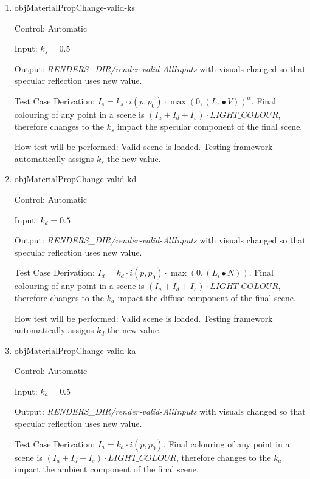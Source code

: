 \documentclass[12pt, titlepage]{article}
\begin{document}
\begin{enumerate}
	\item{objMaterialPropChange-valid-ks\\}
	
	Control: Automatic
	
	Input: $k_{s} = 0.5$
	
	Output: \textit{RENDERS\_DIR/render-valid-AllInputs} with visuals changed 
	so that specular reflection uses new value.
	
	Test Case Derivation: $I_{s} = k_{s}\cdot i(p,p_{0}) \cdot \max(0, 
	({L_{r}}\bullet V))^\alpha$. Final colouring of any point in a scene is 
	$(I_{a}+I_{d}+I_{s})\cdot LIGHT\_COLOUR$, therefore changes to the $k_{s}$ 
	impact the specular component of the final scene.
	
	How test will be performed: Valid scene is loaded. Testing framework 
	automatically assigns $k_{s}$ the new value. 
	
	\item{objMaterialPropChange-valid-kd\\}
	
	Control: Automatic
	
	Input: $k_{d} = 0.5$
	
	Output: \textit{RENDERS\_DIR/render-valid-AllInputs} with visuals changed 
	so that specular reflection uses new value.
	
	Test Case Derivation: $I_{d} = k_{d}\cdot i(p,p_{0}) \cdot 
	\max(0,(L_{i}\bullet N))$. Final colouring of any point in a scene is 
	$(I_{a}+I_{d}+I_{s})\cdot LIGHT\_COLOUR$, therefore changes to the $k_{d}$ 
	impact the diffuse component of the final scene.
	
	How test will be performed: Valid scene is loaded. Testing framework 
	automatically assigns $k_{d}$ the new value. 	

	\item{objMaterialPropChange-valid-ka\\}
	
	Control: Automatic
	
	Input: $k_{a} = 0.5$
	
	Output: \textit{RENDERS\_DIR/render-valid-AllInputs} with visuals changed 
	so that specular reflection uses new value.
	
	Test Case Derivation: $I_{a} = k_{a}\cdot i(p,p_{0})$. Final colouring of 
	any point in a scene is $(I_{a}+I_{d}+I_{s})\cdot LIGHT\_COLOUR$, therefore 
	changes to the $k_{a}$ impact the ambient component of the final scene.
	

\end{enumerate}
\end{document}
